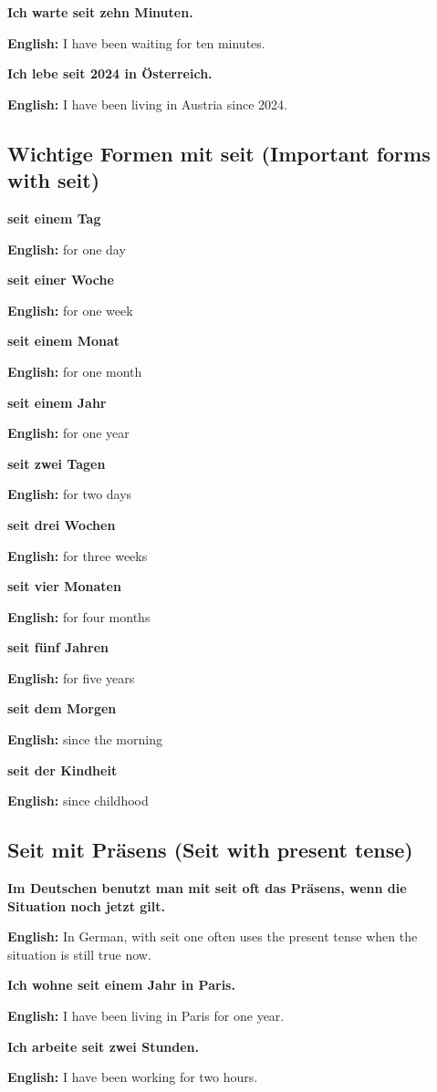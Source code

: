 \documentclass[a4paper,11pt]{article}
\newcommand{\EnglishText}[1]{{\small\color{SoftGray}\textbf{English: }#1\par}}
\newcommand{\EN}[1]{\EnglishText{#1}}
\begin{document}
            \textbf{Ich warte seit zehn Minuten.}
            \EN{I have been waiting for ten minutes.}
            
            \textbf{Ich lebe seit 2024 in Österreich.}
            \EN{I have been living in Austria since 2024.}
        
        \subsection{Wichtige Formen mit seit \textnormal{(Important forms with seit)}}
            
            \textbf{seit einem Tag}
            \EN{for one day}
            
            \textbf{seit einer Woche}
            \EN{for one week}
            
            \textbf{seit einem Monat}
            \EN{for one month}
            
            \textbf{seit einem Jahr}
            \EN{for one year}
            
            \textbf{seit zwei Tagen}
            \EN{for two days}
            
            \textbf{seit drei Wochen}
            \EN{for three weeks}
            
            \textbf{seit vier Monaten}
            \EN{for four months}
            
            \textbf{seit fünf Jahren}
            \EN{for five years}
            
            \textbf{seit dem Morgen}
            \EN{since the morning}
            
            \textbf{seit der Kindheit}
            \EN{since childhood}
        
        \subsection{Seit mit Präsens \textnormal{(Seit with present tense)}}
            
            \textbf{Im Deutschen benutzt man mit seit oft das Präsens, wenn die Situation noch jetzt gilt.}
            \EN{In German, with seit one often uses the present tense when the situation is still true now.}
            
            \textbf{Ich wohne seit einem Jahr in Paris.}
            \EN{I have been living in Paris for one year.}
            
            \textbf{Ich arbeite seit zwei Stunden.}
            \EN{I have been working for two hours.}
            
\end{document}
